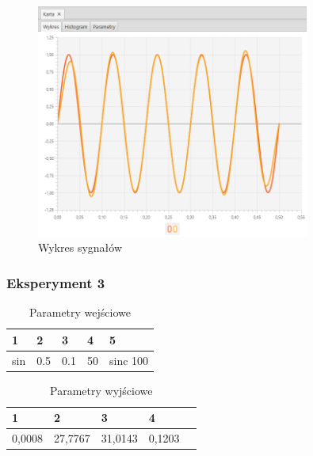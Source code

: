 \documentclass[12pt]{article}
\begin{document}
{{{                \begin{figure}[H]
                    \centering
                    \includegraphics[width=0.8\textwidth]{img/result/experiment1/02/data_draw_original_chart_recon_output_130117.png}
                    \caption{Wykres sygnałów}
                \end{figure}
            }
            \newpage

            \subsubsection{Eksperyment 3} {
                \begin{table}[H]
                    \centering
                    \begin{tabular}{|l|l|l|l|l|}
                        \hline
                        1 & 2 & 3 & 4 & 5   \\ \hline
                        sin & 0.5 & 0.1 & 50 & sinc 100   \\ \hline
                    \end{tabular}
                    \caption{Parametry wejściowe}
                \end{table}

                \begin{table}[H]
                    \centering
                    \begin{tabular}{|l|l|l|l|l|}
                        \hline
                        1 & 2 & 3 & 4   \\ \hline
                        0,0008 & 27,7767 & 31,0143 & 0,1203   \\ \hline
                    \end{tabular}
                    \caption{Parametry wyjściowe}
                \end{table}


}}}
\end{document}
